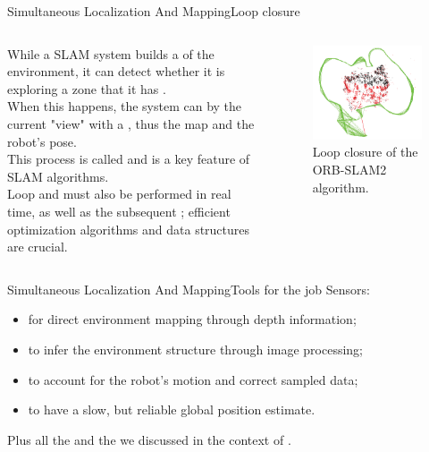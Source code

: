 \begin{frame}{Simultaneous Localization And Mapping}{Loop closure}
  \begin{columns}
    While a SLAM system builds a  of the environment, it can detect whether it is exploring a zone that it has .\\
    \medskip
    When this happens, the system can  by  the current "view" with a , thus  the map and the robot's pose.\\
    \medskip
    This process is called  and is a key feature of SLAM algorithms.\\
    \medskip
    Loop  and  must also be performed in real time, as well as the subsequent ; efficient optimization algorithms and data structures are crucial.

    \begin{figure}
      \centering
      \includegraphics[width=.8\textwidth]{orbgraph}
      \caption{Loop closure of the ORB-SLAM2 algorithm.}
      \label{fig:loopclosure}
    \end{figure}
  \end{columns}
\end{frame}
\begin{frame}{Simultaneous Localization And Mapping}{Tools for the job}
  Sensors:
	\begin{itemize}
		\item {} for direct environment mapping through depth information;
		\item {} to infer the environment structure through image processing;
		\item {} to account for the robot's motion and correct sampled data;
		\item {} to have a slow, but reliable global position estimate.
	\end{itemize}
  \medskip
  Plus all the  and the  we discussed in the context of .
\end{frame}

